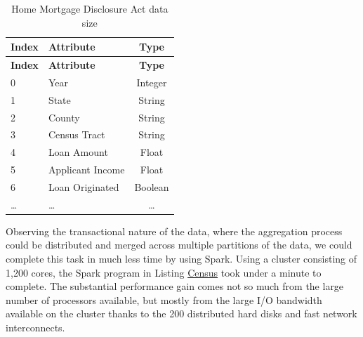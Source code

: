 \documentclass[]{krantz}
\begin{document}
\begin{longtable}[]{@{}llc@{}}
\caption{\label{tab:table5-2} Home Mortgage Disclosure Act data
size}\tabularnewline
\toprule
\textbf{Index} & \textbf{Attribute} & \textbf{Type}\tabularnewline
\midrule
\endfirsthead
\toprule
\textbf{Index} & \textbf{Attribute} & \textbf{Type}\tabularnewline
\midrule
\endhead
0 & Year & Integer\tabularnewline
1 & State & String\tabularnewline
2 & County & String\tabularnewline
3 & Census Tract & String\tabularnewline
4 & Loan Amount & Float\tabularnewline
5 & Applicant Income & Float\tabularnewline
6 & Loan Originated & Boolean\tabularnewline
\ldots{} & \ldots{} & \ldots{}\tabularnewline
\bottomrule
\end{longtable}

Observing the transactional nature of the data, where the aggregation
process could be distributed and merged across multiple partitions of
the data, we could complete this task in much less time by using Spark.
Using a cluster consisting of 1,200 cores, the Spark program in Listing
\protect\hyperlink{list:parallel5}{Census} took under a minute to
complete. The substantial performance gain comes not so much from the
large number of processors available, but mostly from the large I/O
bandwidth available on the cluster thanks to the 200 distributed hard
disks and fast network interconnects.
\end{document}
